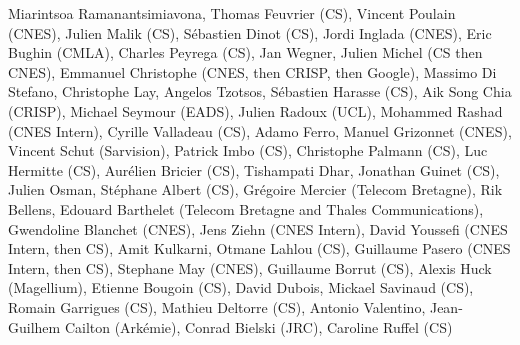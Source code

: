 Miarintsoa Ramanantsimiavona, Thomas Feuvrier (CS), Vincent Poulain (CNES), Julien Malik (CS), S\'ebastien Dinot (CS), Jordi Inglada (CNES), Eric Bughin (CMLA), Charles Peyrega (CS), Jan Wegner, Julien Michel (CS then CNES), Emmanuel Christophe (CNES, then CRISP, then Google), Massimo Di Stefano, Christophe Lay, Angelos Tzotsos, S\'ebastien Harasse (CS), Aik Song Chia (CRISP), Michael Seymour (EADS), Julien Radoux (UCL), Mohammed Rashad (CNES Intern), Cyrille Valladeau (CS), Adamo Ferro, Manuel Grizonnet (CNES), Vincent Schut (Sarvision), Patrick Imbo (CS), Christophe Palmann (CS), Luc Hermitte (CS), Aur\'elien Bricier (CS), Tishampati Dhar, Jonathan Guinet (CS), Julien Osman, St\'ephane Albert (CS), Gr\'egoire Mercier (Telecom Bretagne), Rik Bellens, Edouard Barthelet (Telecom Bretagne and Thales Communications), Gwendoline Blanchet (CNES), Jens Ziehn (CNES Intern), David Youssefi  (CNES Intern, then CS), Amit Kulkarni, Otmane Lahlou (CS), Guillaume Pasero (CNES Intern, then CS), Stephane May (CNES), Guillaume Borrut (CS), Alexis Huck (Magellium), Etienne Bougoin (CS), David Dubois, Mickael Savinaud (CS), Romain Garrigues (CS), Mathieu Deltorre (CS), Antonio Valentino, Jean-Guilhem Cailton (Ark\'emie), Conrad Bielski (JRC), Caroline Ruffel (CS)
